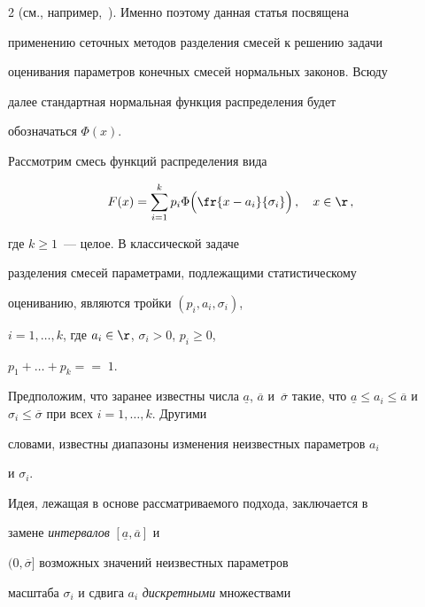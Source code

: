 \begin{multicols}{2}
(см., например,~\cite{2k}). Именно поэтому данная статья посвящена


применению сеточных методов разделения смесей к решению задачи


оценивания параметров конечных смесей нормальных законов. Всюду


далее стандартная нормальная функция распределения будет


обозначаться $\Phi(x)$.





Рассмотрим смесь функций распределения вида


\begin{equation}


F(x)=\sum_{i=1}^kp_i\Phi\Big(\fr{x-a_i}{\sigma_i}\Big)\,,\quad


x\in\r\,,


\label{e1k}


\end{equation}


где $k\ge 1$~--- целое. В классической задаче


разделения смесей параметрами, подлежащими статистическому


оцениванию, являются тройки $(p_i, a_i, \sigma_i)$,


$i=1,\ldots,k$, где $a_i\in\r$, $\sigma_i>0$, $p_i\ge 0$,


$p_1+\ldots+p_k=$\linebreak $=\;1$.





Предположим, что заранее известны числа $\underline a$, $\overline


a$ и~$\overline\sigma$ такие, что $\underline a\le a_i\le\overline


a$ и $\sigma_i\le\overline\sigma$ при всех $i=1,\ldots,k$. Другими


словами, известны диапазоны изменения неизвестных параметров $a_i$


и $\sigma_i$.





Идея, лежащая в основе рассматриваемого подхода, заключается в


замене {\it интервалов} $[\underline a, \overline a]$ и


$(0,\overline\sigma]$ возможных значений неизвестных параметров


масштаба $\sigma_i$ и сдвига $a_i$ {\it дискретными} множествами



\end{multicols}
